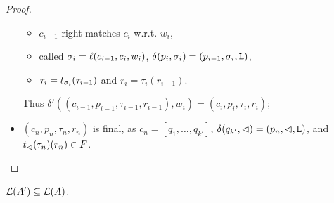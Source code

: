 \begin{proof}
\begin{itemize}
\begin{itemize}
			      \item $c_{i-1}$ right-matches $c_i$ w.r.t. $w_i$,
			      \item called $\sigma_i=\ell(c_{i-1},c_i,w_i)$, $\delta(p_i,\sigma_i)=(p_{i-1},\sigma_i,\mathtt L)$,
			      \item $\tau_i=t_{\sigma_i}(\tau_{i-1})$ and $r_i=\tau_i(r_{i-1})$.
		      \end{itemize}
		      Thus $\delta'((c_{i-1},p_{i-1},\tau_{i-1},r_{i-1}),w_i)=(c_i,p_i,\tau_i,r_i)$;
		\item $(c_n,p_n,\tau_n,r_n)$ is final, as $c_n=[q_1,\dots,q_{k'}]$, $\delta(q_{k'},\lhd)=(p_n,\lhd,\mathtt L)$, and $t_\lhd(\tau_n)(r_n)\in F$. \qedhere
	\end{itemize}
\end{proof}

\begin{lemm}\label{lem:swkLAtoNFA-2}
	$\mathcal L(A')\subseteq\mathcal L(A)$.
\end{lemm}
